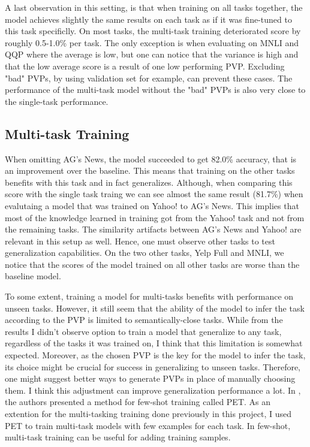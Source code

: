 \documentclass[11pt,a4paper]{article}
\begin{document}
A last observation in this setting, is that when training on all tasks together, the model achieves slightly the same results on each task as if it was fine-tuned to this task specificlly.
On most tasks, the multi-task training deteriorated score by roughly 0.5-1.0\% per task.
The only exception is when evaluating on MNLI and QQP where the average is low, but one can notice that the variance is high and that the low average score is a result of one low performing PVP.
Excluding "bad" PVPs, by using validation set for example, can prevent these cases.
The performance of the multi-task model without the "bad" PVPs is also very close to the single-task performance.

\subsection*{Multi-task Training}

When omitting AG's News, the model succeeded to get 82.0\% accuracy, that is an improvement over the baseline.
This means that training on the other tasks benefits with this task and in fact generalizes.
Although, when comparing this score with the single task traing we can see almost the same result (81.7\%) when evalutaing a model that was trained on Yahoo! to AG's News.
This implies that most of the knowledge learned in training got from the Yahoo! task and not from the remaining tasks.
The similarity artifacts between AG's News and Yahoo! are relevant in this setup as well.
Hence, one must observe other tasks to test generalization capabilities.
On the two other tasks, Yelp Full and MNLI, we notice that the scores of the model trained on all other tasks are worse than the baseline model.

To some extent, training a model for multi-tasks benefits with performance on unseen tasks.
However, it still seem that the ability of the model to infer the task according to the PVP is limited to semantically-close tasks.
While from the results I didn't observe option to train a model that generalize to any task, regardless of the tasks it was trained on, I think that this limitation is somewhat expected.
Moreover, as the chosen PVP is the key for the model to infer the task, its choice might be crucial for success in generalizing to unseen tasks.
Therefore, one might suggest better ways to generate PVPs in place of manually choosing them.
I think this adjustment can improve generalization performance a lot.
In \citet{schick2020exploiting}, the authors presented a method for few-shot training called PET.
As an extention for the multi-tasking training done previously in this project, I used PET to train multi-task models with few examples for each task.
In few-shot, multi-task training can be useful for adding training samples.
\end{document}
